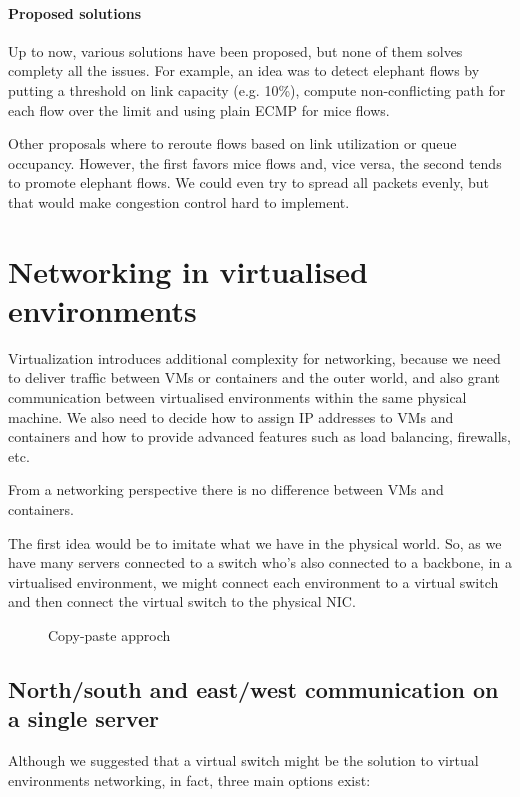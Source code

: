 \paragraph{Proposed solutions}
Up to now, various solutions have been proposed, but none of them solves complety
all the issues. For example, an idea was to detect elephant flows by putting
a threshold on link capacity (e.g. 10\%), compute non-conflicting path for
each flow over the limit and using plain ECMP for mice flows.

Other proposals where to reroute flows based on link utilization or queue
occupancy. However, the first favors mice flows and, vice versa, the second tends
to promote elephant flows. We could even try to spread all packets evenly, but
that would make congestion control hard to implement.

\section{Networking in virtualised environments}
Virtualization introduces additional complexity for networking, because we need
to deliver traffic between VMs or containers and the outer world, and also grant
communication between virtualised environments within the same physical machine.
We also need to decide how to assign IP addresses to VMs and containers and
how to provide advanced features such as load balancing, firewalls, etc.

\begin{note}
    From a networking perspective there is no difference between VMs and
    containers.
\end{note}

\noindent
The first idea would be to imitate what we have in the physical world. So, as
we have many servers connected to a switch who's also connected to a backbone,
in a virtualised environment, we might connect each environment to a virtual
switch and then connect the virtual switch to the physical NIC.

\begin{figure}[h!]
    \centering
    \hspace{1.5cm}
    \caption{Copy-paste approch}
\end{figure}

\subsection{North/south and east/west communication on a single server}
Although we suggested that a virtual switch might be the solution to virtual
environments networking, in fact, three main options exist:


